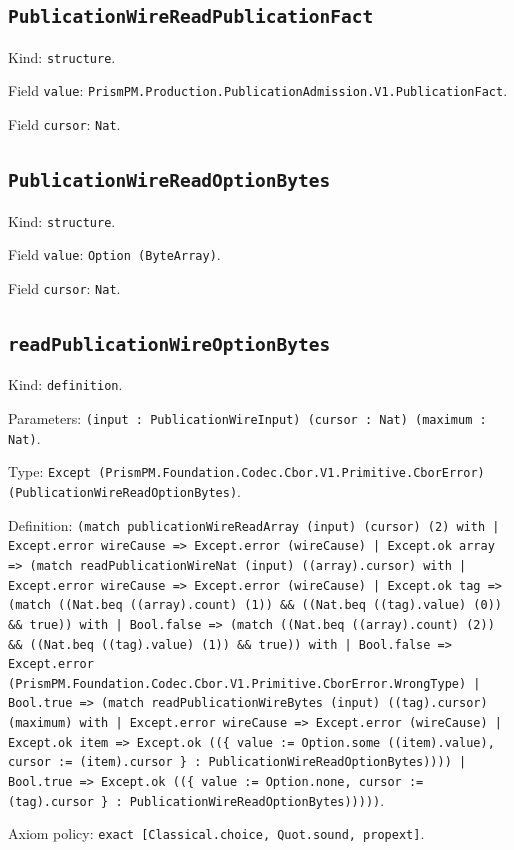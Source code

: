 \documentclass[11pt]{article}
\begin{document}
\subsection*{\texttt{PublicationWireReadPublicationFact}}
\noindent Kind: \texttt{structure}.\par
\noindent Field \texttt{value}: \texttt{PrismPM.Production.PublicationAdmission.V1.PublicationFact}.\par
\noindent Field \texttt{cursor}: \texttt{Nat}.\par
\subsection*{\texttt{PublicationWireReadOptionBytes}}
\noindent Kind: \texttt{structure}.\par
\noindent Field \texttt{value}: \texttt{Option (ByteArray)}.\par
\noindent Field \texttt{cursor}: \texttt{Nat}.\par
\subsection*{\texttt{readPublicationWireOptionBytes}}
\noindent Kind: \texttt{definition}.\par
\noindent Parameters: \texttt{(input : PublicationWireInput) (cursor : Nat) (maximum : Nat)}.\par
\noindent Type: \texttt{Except (PrismPM.Foundation.Codec.Cbor.V1.Primitive.CborError) (PublicationWireReadOptionBytes)}.\par
\noindent Definition: \texttt{(match publicationWireReadArray (input) (cursor) (2) with | Except.error wireCause => Except.error (wireCause) | Except.ok array => (match readPublicationWireNat (input) ((array).cursor) with | Except.error wireCause => Except.error (wireCause) | Except.ok tag => (match ((Nat.beq ((array).count) (1)) \&\& ((Nat.beq ((tag).value) (0)) \&\& true)) with | Bool.false => (match ((Nat.beq ((array).count) (2)) \&\& ((Nat.beq ((tag).value) (1)) \&\& true)) with | Bool.false => Except.error (PrismPM.Foundation.Codec.Cbor.V1.Primitive.CborError.WrongType) | Bool.true => (match readPublicationWireBytes (input) ((tag).cursor) (maximum) with | Except.error wireCause => Except.error (wireCause) | Except.ok item => Except.ok ((\{ value := Option.some ((item).value), cursor := (item).cursor \} : PublicationWireReadOptionBytes)))) | Bool.true => Except.ok ((\{ value := Option.none, cursor := (tag).cursor \} : PublicationWireReadOptionBytes)))))}.\par
\noindent Axiom policy: \texttt{exact [Classical.choice, Quot.sound, propext]}.\par
\end{document}
